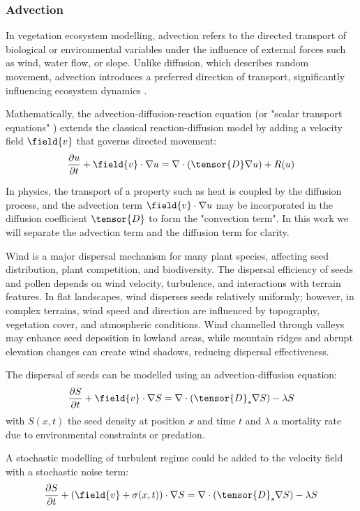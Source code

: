 \subsubsection{Advection}
In vegetation ecosystem modelling, advection refers to the directed transport of biological or environmental variables under the influence of external forces such as wind, water flow, or slope. Unlike diffusion, which describes random movement, advection introduces a preferred direction of transport, significantly influencing ecosystem dynamics \cite{Burger2020}.

Mathematically, the advection-diffusion-reaction equation (or "scalar transport equations" \cite{Baukal2000}) extends the classical reaction-diffusion model by adding a velocity field $\field{v}$ that governs directed movement:
\begin{align}
\frac{\partial u}{\partial t} + \field{v} \cdot \nabla u = \nabla \cdot \left( \tensor{D} \nabla u \right) + R(u)
\end{align}

In physics, the transport of a property such as heat is coupled by the diffusion process, and the advection term $\field{v} \cdot \nabla u$ may be incorporated in the diffusion coefficient $\tensor{D}$ to form the "convection term". In this work we will separate the advection term and the diffusion term for clarity.

Wind is a major dispersal mechanism for many plant species, affecting seed distribution, plant competition, and biodiversity. The dispersal efficiency of seeds and pollen depends on wind velocity, turbulence, and interactions with terrain features. In flat landscapes, wind disperses seeds relatively uniformly; however, in complex terrains, wind speed and direction are influenced by topography, vegetation cover, and atmospheric conditions. Wind channelled through valleys may enhance seed deposition in lowland areas, while mountain ridges and abrupt elevation changes can create wind shadows, reducing dispersal effectiveness.

The dispersal of seeds can be modelled using an advection-diffusion equation:
\begin{align}
\frac{\partial S}{\partial t} + \field{v} \cdot \nabla S = \nabla \cdot (\tensor{D}_s \nabla S) - \lambda S
\end{align}
with $S(x, t)$ the seed density at position $x$ and time $t$ and $\lambda$ a mortality rate due to environmental constraints or predation.

A stochastic modelling of turbulent regime could be added to the velocity field with a stochastic noise term:
\begin{align}
\frac{\partial S}{\partial t} + (\field{v} + \sigma(x, t)) \cdot \nabla S = \nabla \cdot (\tensor{D}_s \nabla S) - \lambda S
\end{align}

